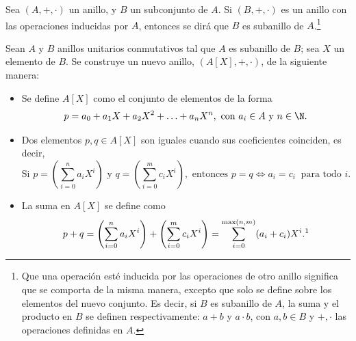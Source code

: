 \begin{deff}[Subanillo]{\cite[p.~33]{GamboaAnillos}}
    Sea $(A,+,\cdot)$ un anillo, y $B$ un subconjunto de $A$. Si $(B,+,\cdot)$ es un anillo con las operaciones inducidas por $A$, entonces se dirá que $B$ es subanillo de $A$.\footnote{Que una operación esté inducida por las operaciones de otro anillo significa que se comporta de la misma manera, excepto que solo se define sobre los elementos del nuevo conjunto. Es decir, si $B$ es subanillo de $A$, la suma y el producto en $B$ se definen respectivamente: $a + b$ y $a \cdot b$, con $a,b\in B$ y $+,\cdot$ las operaciones definidas en $A$.}
\end{deff}

\vspace{-1em}
\begin{deff}{\cite[p.~51]{Rosenberger}}\label{definion:polinomios}
    Sean $A$ y $B$ anillos unitarios conmutativos tal que $A$ es subanillo de $B$; sea $X$ un elemento de $B$. Se construye un nuevo anillo, $(A[X], +,\cdot)$, de la siguiente manera:
    \vspace{-0.1em}
    \begin{itemize}
        \item Se define $A[X]$ como el conjunto de elementos de la forma  
        \[ p = a_0 + a_1X + a_2X^2 + \ldots + a_nX^n , \text{ con }  a_i \in A  \text{ y }  n \in \N.\]
        
        \item Dos elementos $p,q \in A[X]$ son iguales cuando sus coeficientes coinciden, es decir,
        \[
        \text{Si } p = \left(\sum\limits_{i=0}^{n} a_i X^i\right) \text{ y }q = \left(\sum\limits_{i=0}^{m} c_i X^i\right), \text{ entonces } p = q \iff a_i = c_i \ \text{ para todo $i$.}  
        \]

        \item
                La suma en $A[X]$ se define como 
                \[
                    p + q = \left(\sum\limits_{i=0}^n a_i X^i\right) + \left(\sum\limits_{i=0}^m c_i X^i\right) = \sum\limits_{i=0}^{\text{max}(n,m)} (a_i + c_i)X^i.
                    \text{\footnotemark}
                \]
            \vspace{-1em}
        

\end{itemize}
\end{deff}
